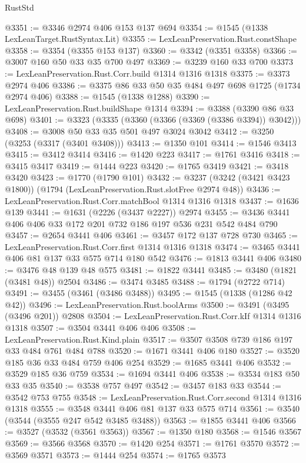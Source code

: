 \begin{lexlean}{RustStd}
\begin{coremodule}
{\begin{coremodule}
{{{{{{{{{{{{{{@3351 := @3346 @2974 @406 @153 @137 @694
@3354 := @1545 (@1338 LexLeanTarget.RustSyntax.Lit)
@3355 := LexLeanPreservation.Rust.constShape
@3358 := @3354 (@3355 @153 @137)
@3360 := @3342 (@3351 @3358)
@3366 := @3007 @160 @50 @33 @35 @700 @497
@3369 := @3239 @160 @33 @700
@3373 := LexLeanPreservation.Rust.Corr.build @1314 @1316 @1318
@3375 := @3373 @2974 @406
@3386 := @3375 @86 @33 @50 @35 @484 @497 @698 @1725 (@1734 @2974 @406)
@3388 := @1545 (@1338 @1288)
@3390 := LexLeanPreservation.Rust.buildShape @1314
@3394 := @3388 (@3390 @86 @33 @698)
@3401 := @3323 (@3335 (@3360 (@3366 (@3369 (@3386 @3394)) @3042)))
@3408 := @3008 @50 @33 @35 @501 @497 @3024 @3042
@3412 := @3250 (@3253 (@3317 (@3401 @3408)))
@3413 := @1350 @101
@3414 := @1546 @3413
@3415 := @3412 @3414
@3416 := @1420 @223
@3417 := @1761 @3416
@3418 := @3415 @3417
@3419 := @1444 @223
@3420 := @1765 @3419
@3421 := @3418 @3420
@3423 := @1770 (@1790 @101)
@3432 := @3237 (@3242 (@3421 @3423 @1800)) (@1794 (LexLeanPreservation.Rust.slotFree @2974 @48))
@3436 := LexLeanPreservation.Rust.Corr.matchBool @1314 @1316 @1318
@3437 := @1636 @139
@3441 := @1631 (@2226 (@3437 @2227)) @2974
@3455 := @3436 @3441 @406 @406 @33 @172 @201 @732 @186 @197 @536 @231 @542 @484 @790
@3457 := @2654 @3441 @406
@3461 := @3457 @172 @137 @728 @730
@3465 := LexLeanPreservation.Rust.Corr.first @1314 @1316 @1318
@3474 := @3465 @3441 @406 @81 @137 @33 @575 @714 @180 @542
@3476 := @1813 @3441 @406
@3480 := @3476 @48 @139 @48 @575
@3481 := @1822 @3441
@3485 := @3480 (@1821 (@3481 @48)) @2504
@3486 := @3474 @3485
@3488 := @1794 (@2722 @714)
@3491 := @3455 (@3461 (@3486 @3488))
@3495 := @1545 (@1338 (@1286 @42 @42))
@3496 := LexLeanPreservation.Rust.boolArms
@3500 := @3491 (@3495 (@3496 @201)) @2808
@3504 := LexLeanPreservation.Rust.Corr.kIf @1314 @1316 @1318
@3507 := @3504 @3441 @406 @406
@3508 := LexLeanPreservation.Rust.Kind.plain
@3517 := @3507 @3508 @739 @186 @197 @33 @484 @761 @484 @788
@3520 := @1671 @3441 @406 @180
@3527 := @3520 @185 @36 @33 @484 @759 @406 @254
@3529 := @1685 @3441 @406
@3532 := @3529 @185 @36 @759
@3534 := @1694 @3441 @406
@3538 := @3534 @183 @50 @33 @35
@3540 := @3538 @757 @497
@3542 := @3457 @183 @33
@3544 := @3542 @753 @755
@3548 := LexLeanPreservation.Rust.Corr.second @1314 @1316 @1318
@3555 := @3548 @3441 @406 @81 @137 @33 @575 @714
@3561 := @3540 (@3544 (@3555 @247 @542 @3485 @3488))
@3563 := @1855 @3441 @406
@3566 := @3527 (@3532 (@3561 @3563))
@3567 := @1350 @180
@3568 := @1546 @3567
@3569 := @3566 @3568
@3570 := @1420 @254
@3571 := @1761 @3570
@3572 := @3569 @3571
@3573 := @1444 @254
@3574 := @1765 @3573
}}}}}}}}}}}}}}
\end{coremodule}}
\end{coremodule}
\end{lexlean}
